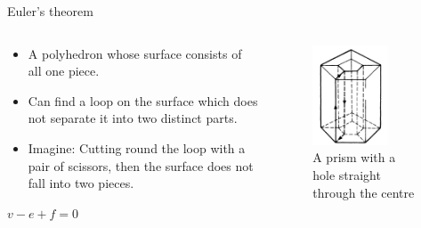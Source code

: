 \documentclass{beamer}
\begin{document}
\begin{frame}{Euler's theorem}
\begin{columns}
\begin{column}{0.5\textwidth}
  \begin{block}{}
    \begin{itemize}
    \item A polyhedron whose surface consists of all one piece.
    \item Can find a loop on the surface which does not separate it into two distinct parts.
    \item Imagine: Cutting round the loop with a pair of scissors, then the surface does not fall into two pieces.
    \end{itemize}
  \end{block}
  \begin{block}{}
    $v - e + f = 0$
  \end{block}
\end{column}
\begin{column}{0.5\textwidth}
    \begin{figure}
    \centering
        \includegraphics[width=0.7\textwidth]{figure_1_3.png}
        \caption{A prism with a hole straight through the centre}
    \end{figure}
\end{column}
\end{columns}
\end{frame}
\end{document}
